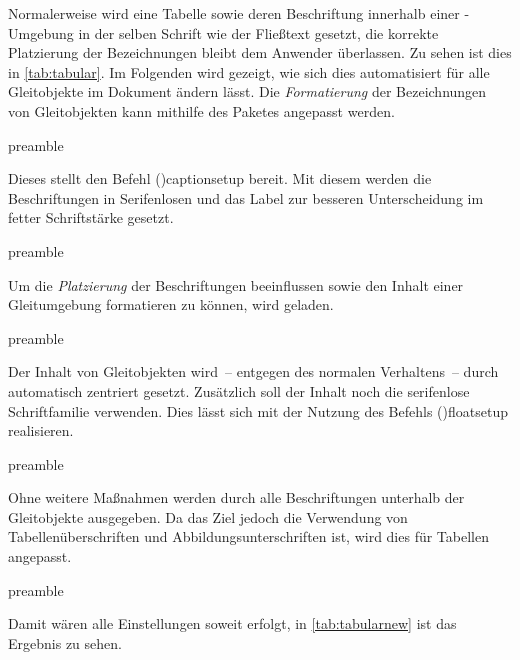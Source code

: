 \documentclass[%
  english,ngerman,%
  cdgeometry=no,DIV=12,%
  cd=false,cdfont=false,cdtitle=true,%
  headings=normal,%
  automark,%
  listof=toc,%
]{tudscrartcl}
\begin{document}
Normalerweise wird eine Tabelle sowie deren Beschriftung innerhalb einer 
-Umgebung in der selben Schrift wie der Fließtext 
gesetzt, die korrekte Platzierung der Bezeichnungen bleibt dem Anwender 
überlassen. Zu sehen ist dies in \autoref{tab:tabular}. Im Folgenden wird 
gezeigt, wie sich dies automatisiert für alle Gleitobjekte im Dokument ändern 
lässt. Die \emph{Formatierung} der Bezeichnungen von Gleitobjekten kann 
mithilfe des Paketes  angepasst werden.
%
\begin{Code}{preamble}
\usepackage{caption}
\end{Code}

Dieses stellt den Befehl \Macro(){captionsetup} bereit. Mit 
diesem werden die Beschriftungen in Serifenlosen und das Label zur besseren 
Unterscheidung im fetter Schriftstärke gesetzt.
%
\begin{Code}[input]{preamble}
\captionsetup{font=sf,labelfont=bf,labelsep=space}
\end{Code}

Um die \emph{Platzierung} der Beschriftungen beeinflussen sowie den Inhalt 
einer Gleitumgebung formatieren zu können, wird  geladen. 
%
\begin{Code}{preamble}
\usepackage{floatrow}
\end{Code}

Der Inhalt von Gleitobjekten wird~-- entgegen des normalen Verhaltens~-- durch 
 automatisch zentriert gesetzt. Zusätzlich soll der Inhalt 
noch die serifenlose Schriftfamilie verwenden. Dies lässt sich mit der Nutzung 
des Befehls \Macro(){floatsetup} realisieren.
%
\begin{Code}[input]{preamble}
\end{Code}

Ohne weitere Maßnahmen werden durch  alle Beschriftungen 
unterhalb der Gleitobjekte ausgegeben. Da das Ziel jedoch die Verwendung von 
Tabellenüberschriften und Abbildungsunterschriften ist, wird dies für Tabellen
angepasst.
%
\begin{Code}[input]{preamble}
\end{Code}

Damit wären alle Einstellungen soweit erfolgt, in \autoref{tab:tabularnew} ist 
das Ergebnis zu sehen. 
%
\begin{table}
\end{table}%
\end{document}
